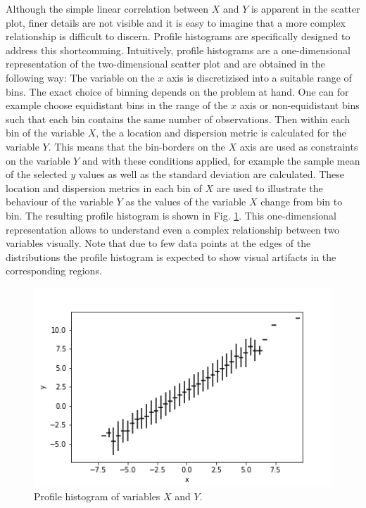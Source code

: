\documentclass[BCOR=1mm, DIV=calc,10pt,
twoside=true,
twocolumn,
headings=normal]{scrartcl}
\newcommand{\fig}{Fig. }
\begin{document}
Although the simple linear correlation between $X$ and $Y$ is apparent in the scatter plot, finer details are not
visible and it is easy to imagine that a more complex relationship is difficult to discern.
Profile histograms are specifically designed to address this shortcomming. Intuitively, profile
histograms are a one-dimensional representation of the two-dimensional scatter plot and are obtained 
in the following way: The variable on the $x$ axis is discretizised into a suitable range of bins.
The exact choice of binning depends on the problem at hand. One can for example choose equidistant bins
in the range of the $x$ axis or non-equidistant bins such that each bin contains the same number of observations.
Then within each bin of the variable $X$, the a location and dispersion metric is calculated for the variable $Y$.
This means that the bin-borders on the $X$ axis are used as constraints on the variable $Y$ and with these
conditions applied, for example the sample mean of the selected $y$ values as well as the standard deviation
are calculated.
These location and dispersion metrics in each bin of $X$ are used to illustrate the behaviour of the variable $Y$
as the values of the variable $X$ change from bin to bin.
The resulting profile histogram is shown in \fig \ref{fig:profile}. This one-dimensional representation
allows to understand even a complex relationship between two variables visually. Note
that due to few data points at the edges of the distributions the profile histogram is expected
to show visual artifacts in the corresponding regions.
 \begin{figure}
\begin{center}
\includegraphics[scale=0.5]{../figures/profile}
\caption{\label{fig:profile} Profile histogram of variables $X$ and $Y$.}
\end{center}
\end{figure} 
\end{document}
